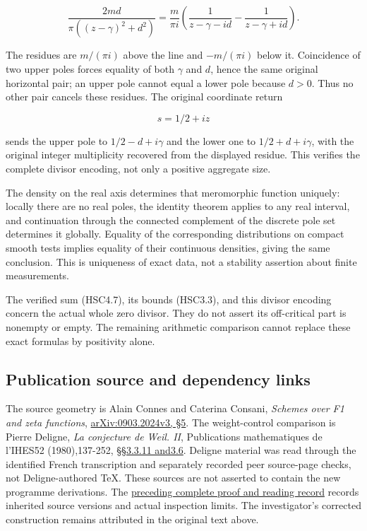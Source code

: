 \[
 \frac{2md}{\pi((z-\gamma)^2+d^2)}
 =\frac{m}{\pi i}
 \left(\frac1{z-\gamma-id}-\frac1{z-\gamma+id}\right).
\tag{HSC6.2}
\]

The residues are \(m/(\pi i)\) above the line and \(-m/(\pi i)\) below
it. Coincidence of two upper poles forces equality of both \(\gamma\)
and \(d\), hence the same original horizontal pair; an upper pole cannot
equal a lower pole because \(d>0\). Thus no other pair cancels these
residues. The original coordinate return

\[
 s=1/2+iz
\]

sends the upper pole to \(1/2-d+i\gamma\) and the lower one to
\(1/2+d+i\gamma\), with the original integer multiplicity recovered from
the displayed residue. This verifies the complete divisor encoding, not
only a positive aggregate size.

The density on the real axis determines that meromorphic function
uniquely: locally there are no real poles, the identity theorem applies
to any real interval, and continuation through the connected complement
of the discrete pole set determines it globally. Equality of the
corresponding distributions on compact smooth tests implies equality of
their continuous densities, giving the same conclusion. This is
uniqueness of exact data, not a stability assertion about finite
measurements.

The verified sum (HSC4.7), its bounds (HSC3.3), and this divisor
encoding concern the actual whole zero divisor. They do not assert its
off-critical part is nonempty or empty. The remaining arithmetic
comparison cannot replace these exact formulas by positivity alone.

\subsection{Publication source and dependency
links}\label{publication-source-and-dependency-links}

The source geometry is Alain Connes and Caterina Consani, \emph{Schemes
over F1 and zeta functions},
\href{https://arxiv.org/abs/0903.2024v3}{arXiv:0903.2024v3, §5}. The
weight-control comparison is Pierre Deligne, \emph{La conjecture de
Weil. II}, Publications mathematiques de l'IHES52 (1980),137-252,
\href{https://www.numdam.org/item/PMIHES_1980__52__137_0/}{§§3.3.11
and3.6}. Deligne material was read through the identified French
transcription and separately recorded peer source-page checks, not
Deligne-authored TeX. These sources are not asserted to contain the new
programme derivations. The
\href{https://github.com/KokunoYumeto/zeta-function-research-reader/blob/36a82ecca98addb8a98b48204e349737856c7223/workbenches/splitzero-tandem/continuations/20260924-cohomology-weight-and-character-lifts/BUILD_AND_REVIEW.md}{preceding
complete proof and reading record} records inherited source versions and
actual inspection limits. The investigator's corrected construction
remains attributed in the original text above.
